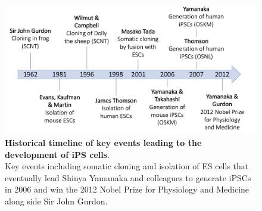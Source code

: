 








\begin{figure}[h]
\centering
\includegraphics[width=15cm]{Chapter1/Fig/ipsc_timeline.png}
\caption[iPSCs timeline]{\textbf{Historical timeline of key events leading to the development of iPS cells}.\\
Key events including somatic cloning and isolation of ES cells that eventually lead Shinya Yamanaka and colleagues to generate iPSCs in 2006 and win the 2012 Nobel Prize for Physiology and Medicine along side Sir John Gurdon.}
\label{fig:ipsc_timeline}
\end{figure}

